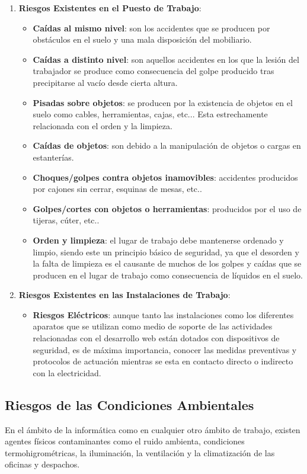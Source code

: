 \begin{enumerate}[label=\alph*.]
    \item \textbf{Riesgos Existentes en el Puesto de Trabajo}:
    \begin{itemize}
        \item \textbf{Caídas al mismo nivel}: son los accidentes que se producen por obstáculos en el suelo y una mala disposición del mobiliario.
        \item \textbf{Caídas a distinto nivel}: son aquellos accidentes en los que la lesión del trabajador se produce como consecuencia del golpe producido tras precipitarse al vacío desde cierta altura.
        \item \textbf{Pisadas sobre objetos}: se producen por la existencia de objetos en el suelo como cables, herramientas, cajas, etc... Esta estrechamente relacionada con el orden y la limpieza.
        \item \textbf{Caídas de objetos}: son debido a la manipulación de objetos o cargas en estanterías.
        \item \textbf{Choques/golpes contra objetos inamovibles}: accidentes producidos por cajones sin cerrar, esquinas de mesas, etc..
        \item \textbf{Golpes/cortes con objetos o herramientas}: producidos por el uso de tijeras, cúter, etc..
        \item \textbf{Orden y limpieza}: el lugar de trabajo debe mantenerse ordenado y limpio, siendo este un principio básico de seguridad, ya que el desorden y la falta de limpieza es el causante de muchos de los golpes y caídas que se producen en el lugar de trabajo como consecuencia de líquidos en el suelo.
    \end{itemize}

    \item \textbf{Riesgos Existentes en las Instalaciones de Trabajo}:
    \begin{itemize}
        \item \textbf{Riesgos Eléctricos}: aunque tanto las instalaciones como los diferentes aparatos que se utilizan como medio de soporte de las actividades relacionadas con el desarrollo web están dotados con dispositivos de seguridad, es de máxima importancia, conocer las medidas preventivas y protocolos de actuación mientras se esta en contacto directo o indirecto con la electricidad.
    \end{itemize}
\end{enumerate}

\subsection{Riesgos de las Condiciones Ambientales}
En el ámbito de la informática como en cualquier otro ámbito de trabajo, existen agentes físicos contaminantes como el ruido ambienta, condiciones termohigrométricas, la iluminación, la ventilación y la climatización de las oficinas y despachos.

